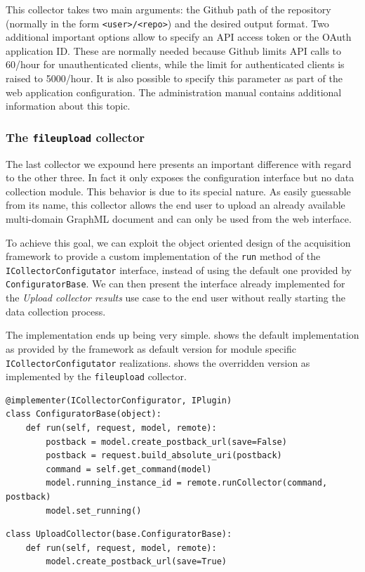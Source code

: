 This collector takes two main arguments: the Github path of the repository (normally in the form \texttt{<user>/<repo>}) and the desired output format. Two additional important options allow to specify an API access token or the OAuth application ID. These are normally needed because Github limits API calls to 60/hour for unauthenticated clients, while the limit for authenticated clients is raised to 5000/hour. It is also possible to specify this parameter as part of the web application configuration. The administration manual contains additional information about this topic.

\subsubsection{The \texttt{fileupload} collector}

The last collector we expound here presents an important difference with regard to the other three. In fact it only exposes the configuration interface but no data collection module. This behavior is due to its special nature. As easily guessable from its name, this collector allows the end user to upload an already available multi-domain GraphML document and can only be used from the web interface.

To achieve this goal, we can exploit the object oriented design of the acquisition framework to provide a custom implementation of the \texttt{run} method of the \texttt{ICollectorConfigutator} interface, instead of using the default one provided by \texttt{ConfiguratorBase}. We can then present the interface already implemented for the \emph{Upload collector results} use case to the end user without really starting the data collection process.

The implementation ends up being very simple.  shows the default implementation as provided by the framework as default version for module specific \texttt{ICollector\BreakableSlash{}Configutator} realizations.  shows the overridden version as implemented by the \texttt{fileupload} collector.

\begin{lstlisting}[caption={Default implementation of the \texttt{run} method as found in the \texttt{ConfiguratorBase} class.},label=lst:run-base]
@implementer(ICollectorConfigurator, IPlugin)
class ConfiguratorBase(object):
    def run(self, request, model, remote):
        postback = model.create_postback_url(save=False)
        postback = request.build_absolute_uri(postback)
        command = self.get_command(model)
        model.running_instance_id = remote.runCollector(command, postback)
        model.set_running()
\end{lstlisting}

\begin{lstlisting}[caption={Custom implementation of the \texttt{run} method as found in the \texttt{UploadCollector} class.},label=lst:run-upload]
class UploadCollector(base.ConfiguratorBase):
    def run(self, request, model, remote):
        model.create_postback_url(save=True)
\end{lstlisting}


